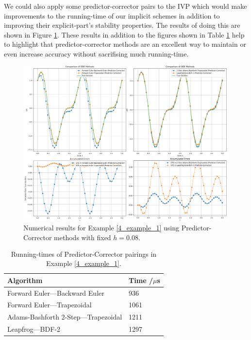 \documentclass[12pt, twoside]{report}
\theoremstyle{plain}
\theoremstyle{definition}
\theoremstyle{definition}
\begin{document}
        We could also apply some predictor-corrector pairs to the IVP
        which would make improvements to the running-time of our implicit 
        schemes in addition to improving their explicit-part's stability 
        properties. The results of doing this are shown in Figure 
        \ref{4_pc_graphs_1}. These results in addition to the figures shown
        in Table \ref{4_pc_runtimes} help to highlight that 
        predictor-corrector methods are an excellent way to maintain or even
        increase accuracy without sacrifising much running-time.
        \begin{figure}[H]
            \centering
                \includegraphics[width=\columnwidth]{1_pc}
                \caption{Numerical results for Example \ref{4_example_1}
                using Predictor-Corrector methods with fixed $h=0.08$.}
                \label{4_pc_graphs_1}
        \end{figure}

        \begin{table}
            \centering
                \begin{tabular}[H]{| l | l |}
                    \hline
                    Algorithm & Time /$\mu$s \\ \hline
                    Forward Euler---Backward Euler & 936 \\ \hline
                    Forward Euler---Trapezoidal & 1061 \\ \hline
                    Adams-Bashforth 2-Step---Trapezoidal & 1211 \\ \hline
                    Leapfrog---BDF-2 & 1297 \\
                    \hline
                \end{tabular}
            \label{4_pc_runtimes}
            \caption{Running-times of Predictor-Corrector pairings in Example
            \ref{4_example_1}.}
        \end{table}
\end{document}
